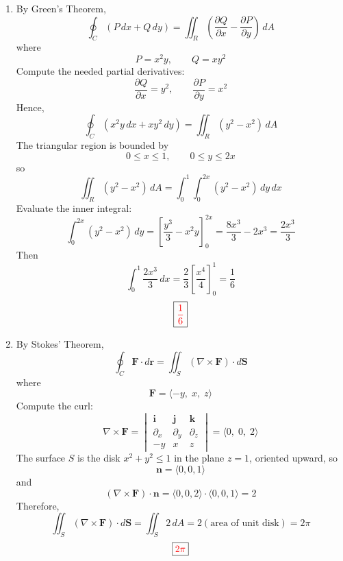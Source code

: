 \begin{enumerate}
    \item By Green's Theorem,
          \[
              \oint_C (P\,dx+Q\,dy)=\iint_R \left(\frac{\partial Q}{\partial x}-\frac{\partial P}{\partial y}\right)\,dA
          \]
          where
          \[
              P=x^2y,\qquad Q=xy^2
          \]
          Compute the needed partial derivatives:
          \[
              \frac{\partial Q}{\partial x}=y^2,\qquad
              \frac{\partial P}{\partial y}=x^2
          \]
          Hence,
          \[
              \oint_C (x^2y\,dx+xy^2\,dy)=\iint_R (y^2-x^2)\,dA
          \]
          The triangular region is bounded by
          \[
              0\le x\le 1,\qquad 0\le y\le 2x
          \]
          so
          \[
              \iint_R (y^2-x^2)\,dA
              =
              \int_0^1\int_0^{2x}(y^2-x^2)\,dy\,dx
          \]
          Evaluate the inner integral:
          \[
              \int_0^{2x}(y^2-x^2)\,dy
              =
              \left[\frac{y^3}{3}-x^2y\right]_0^{2x}
              =\frac{8x^3}{3}-2x^3
              =\frac{2x^3}{3}
          \]
          Then
          \[
              \int_0^1 \frac{2x^3}{3}\,dx
              =\frac23\left[\frac{x^4}{4}\right]_0^1
              =\frac{1}{6}
          \]
          \[
              \boxed{\textcolor{red}{\frac16}}
          \]

    \item By Stokes’ Theorem,
          \[
              \oint_C \mathbf{F}\cdot d\mathbf{r}
              =
              \iint_S (\nabla\times \mathbf{F})\cdot d\mathbf{S}
          \]
          where
          \[
              \mathbf{F}=\langle -y,\; x,\; z\rangle
          \]
          Compute the curl:
          \[
              \nabla\times \mathbf{F}
              =
              \begin{vmatrix}
                  \mathbf{i} & \mathbf{j} & \mathbf{k} \\
                  \partial_x & \partial_y & \partial_z \\
                  -y         & x          & z
              \end{vmatrix}
              =\langle 0,\; 0,\; 2\rangle
          \]
          The surface $S$ is the disk $x^2+y^2\le 1$ in the plane $z=1$, oriented upward, so
          \[
              \mathbf{n}=\langle 0,0,1\rangle
          \]
          and
          \[
              (\nabla\times \mathbf{F})\cdot \mathbf{n}
              =\langle 0,0,2\rangle\cdot \langle 0,0,1\rangle
              =2
          \]
          Therefore,
          \[
              \iint_S (\nabla\times \mathbf{F})\cdot d\mathbf{S}
              =\iint_S 2\,dA
              =2(\text{area of unit disk})
              =2\pi
          \]
          \[
              \boxed{\textcolor{red}{2\pi}}
          \]


\end{enumerate}
